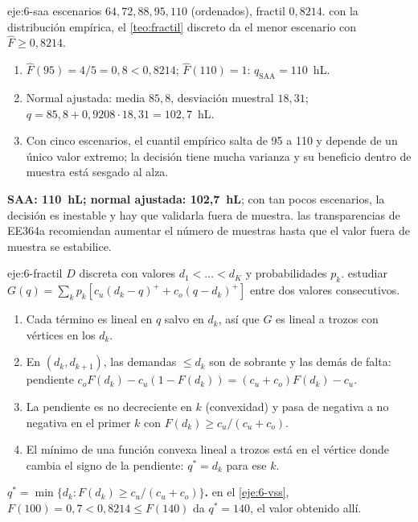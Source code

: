\begin{solucion}{eje:6-saa}
\datos escenarios $64,72,88,95,110$ (ordenados), fractil $0{,}8214$.
\planteamiento con la distribución empírica, el \cref{teo:fractil} discreto da el menor escenario con $\hat F\ge 0{,}8214$.
\pasos
\begin{enumerate}[label=\arabic*.]
  \item $\hat F(95)=4/5=0{,}8<0{,}8214$; $\hat F(110)=1$: $q_{\mathrm{SAA}}=110$~hL.
  \item Normal ajustada: media $85{,}8$, desviación muestral $18{,}31$; $q=85{,}8+0{,}9208\cdot 18{,}31=102{,}7$~hL.
  \item Con cinco escenarios, el cuantil empírico salta de 95 a 110 y depende de un único valor extremo; la decisión tiene mucha varianza y su beneficio dentro de muestra está sesgado al alza.
\end{enumerate}
\resultado \textbf{SAA: 110~hL; normal ajustada: 102,7~hL}; con tan pocos escenarios, la decisión es inestable y hay que validarla fuera de muestra.
\comprobacion las transparencias de EE364a recomiendan aumentar el número de muestras hasta que el valor fuera de muestra se estabilice.
\end{solucion}

\begin{solucion}{eje:6-fractil}
\datos $D$ discreta con valores $d_1<\dots<d_K$ y probabilidades $p_k$.
\planteamiento estudiar $G(q)=\sum_kp_k[c_u(d_k-q)^{+}+c_o(q-d_k)^{+}]$ entre dos valores consecutivos.
\pasos
\begin{enumerate}[label=\arabic*.]
  \item Cada término es lineal en $q$ salvo en $d_k$, así que $G$ es lineal a trozos con vértices en los $d_k$.
  \item En $(d_k,d_{k+1})$, las demandas $\le d_k$ son de sobrante y las demás de falta: pendiente $c_oF(d_k)-c_u(1-F(d_k))=(c_u+c_o)F(d_k)-c_u$.
  \item La pendiente es no decreciente en $k$ (convexidad) y pasa de negativa a no negativa en el primer $k$ con $F(d_k)\ge c_u/(c_u+c_o)$.
  \item El mínimo de una función convexa lineal a trozos está en el vértice donde cambia el signo de la pendiente: $q^{*}=d_k$ para ese $k$.
\end{enumerate}
\resultado \textbf{$q^{*}=\min\{d_k: F(d_k)\ge c_u/(c_u+c_o)\}$.}
\comprobacion en el \cref{eje:6-vss}, $F(100)=0{,}7<0{,}8214\le F(140)$ da $q^{*}=140$, el valor obtenido allí.
\end{solucion}

